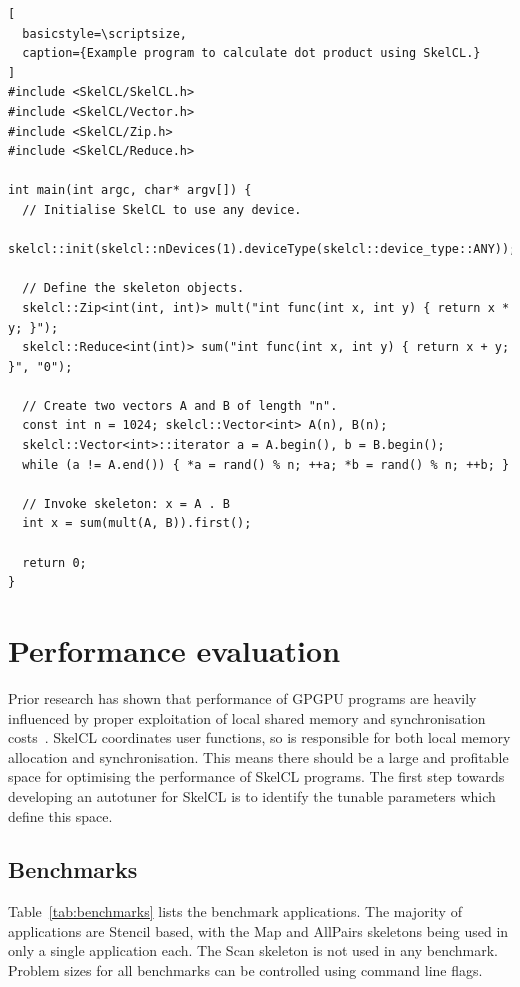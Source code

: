 \lstset{language=C++}
\begin{lstlisting}[
  basicstyle=\scriptsize,
  caption={Example program to calculate dot product using SkelCL.}
]
#include <SkelCL/SkelCL.h>
#include <SkelCL/Vector.h>
#include <SkelCL/Zip.h>
#include <SkelCL/Reduce.h>

int main(int argc, char* argv[]) {
  // Initialise SkelCL to use any device.
  skelcl::init(skelcl::nDevices(1).deviceType(skelcl::device_type::ANY));

  // Define the skeleton objects.
  skelcl::Zip<int(int, int)> mult("int func(int x, int y) { return x * y; }");
  skelcl::Reduce<int(int)> sum("int func(int x, int y) { return x + y; }", "0");

  // Create two vectors A and B of length "n".
  const int n = 1024; skelcl::Vector<int> A(n), B(n);
  skelcl::Vector<int>::iterator a = A.begin(), b = B.begin();
  while (a != A.end()) { *a = rand() % n; ++a; *b = rand() % n; ++b; }

  // Invoke skeleton: x = A . B
  int x = sum(mult(A, B)).first();

  return 0;
}
\end{lstlisting}

\section{Performance evaluation}

Prior research has shown that performance of GPGPU programs are
heavily influenced by proper exploitation of local shared memory and
synchronisation costs~\cite{Ryoo2008a, Lee2010}. SkelCL coordinates
user functions, so is responsible for both local memory allocation and
synchronisation. This means there should be a large and profitable
space for optimising the performance of SkelCL programs. The first
step towards developing an autotuner for SkelCL is to identify the
tunable parameters which define this space.

\subsection{Benchmarks}

Table~\ref{tab:benchmarks} lists the benchmark applications. The
majority of applications are Stencil based, with the Map and AllPairs
skeletons being used in only a single application each. The Scan
skeleton is not used in any benchmark. Problem sizes for all
benchmarks can be controlled using command line flags.

